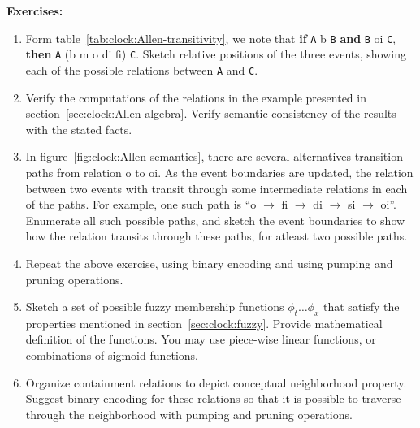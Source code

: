 \vspace{2mm}
\noindent
{\bf Exercises:}

\noindent
{}

\begin{enumerate}
	\item  Form table~\ref{tab:clock:Allen-transitivity}, we note that {\bf if} \texttt{A} b \texttt{B} {\bf and}
		\texttt{B} oi \texttt{C}, {\bf then} \texttt{A} (b m o di fi) \texttt{C}. Sketch relative positions
		of the three events, showing each of the possible relations between \texttt{A} and \texttt{C}.
	\item Verify the computations of the relations in the example presented in section~\ref{sec:clock:Allen-algebra}. 
		Verify semantic consistency of the results with the stated facts.
	\item In figure~\ref{fig:clock:Allen-semantics}, there are several alternatives transition paths from relation o to oi. 
		As the event boundaries are updated, the relation between two events with transit through some intermediate
		relations in each of the paths. For example, one such path is ``o $\rightarrow$ fi $\rightarrow$ di $\rightarrow$ 
		si $\rightarrow$ oi''. Enumerate all such possible paths, and sketch the event boundaries to show how the
		relation transits through these paths, for atleast two possible paths.
	\item Repeat the above exercise, using binary encoding and using pumping and pruning operations.
	\item Sketch a set of possible fuzzy membership functions $\phi_t \dots \phi_x$ that satisfy the properties mentioned
		in section~\ref{sec:clock:fuzzy}. Provide mathematical definition of the functions. You may use piece-wise
		linear functions, or combinations of sigmoid functions.
	\item Organize containment relations to depict conceptual neighborhood property. Suggest binary encoding for these
		relations so that it is possible to traverse through the neighborhood with pumping and pruning operations.
\end{enumerate}
